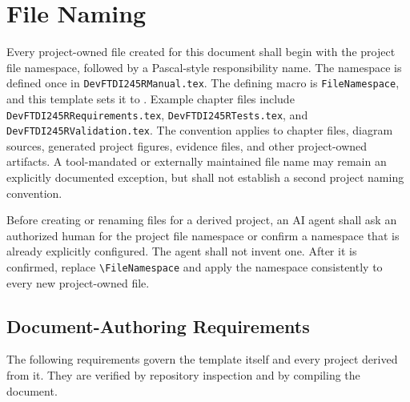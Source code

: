 \section{File Naming}

Every project-owned file created for this document shall begin with the project
file namespace, followed by a Pascal-style responsibility name. The namespace
is defined once in \texttt{DevFTDI245RManual.tex}. The defining macro is
\texttt{FileNamespace}, and this template sets it to
\texttt{\FileNamespace}. Example chapter files include
\texttt{DevFTDI245RRequirements.tex}, \texttt{DevFTDI245RTests.tex}, and
\texttt{DevFTDI245RValidation.tex}. The convention applies to chapter files, diagram
sources, generated project figures, evidence files, and other project-owned
artifacts. A tool-mandated or externally maintained file name may remain an
explicitly documented exception, but shall not establish a second project
naming convention.

Before creating or renaming files for a derived project, an AI agent shall ask
an authorized human for the project file namespace or confirm a namespace that
is already explicitly configured. The agent shall not invent one. After it is
confirmed, replace \verb|\FileNamespace| and apply the namespace consistently
to every new project-owned file.

\subsection{Document-Authoring Requirements}
The following requirements govern the template itself and every project derived
from it. They are verified by repository inspection and by compiling the
document.

